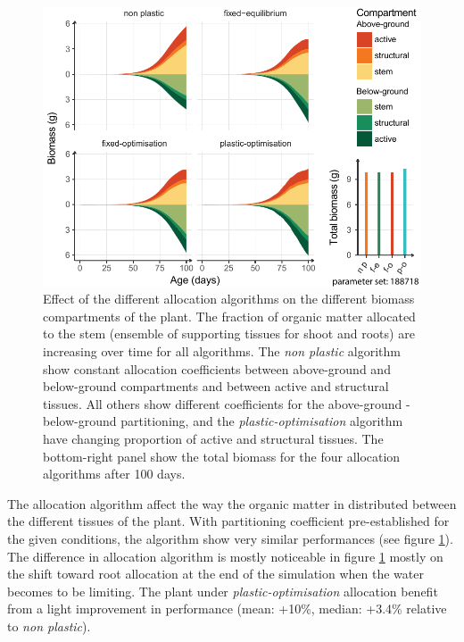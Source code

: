 \begin{figure}\label{fig:allocation}
\includegraphics[width = \textwidth]{./2_PP/Figures/Individual/allocation_rules.pdf}
\caption[Effect of the different allocation algorithms on the different biomass compartments]{Effect of the different allocation algorithms on the different biomass compartments of the plant. The fraction of organic matter allocated to the stem (ensemble of supporting tissues for shoot and roots) are increasing over time for all algorithms. The \textit{non plastic} algorithm show constant allocation coefficients between above-ground and below-ground compartments and between active and structural tissues. All others show different coefficients for the above-ground - below-ground partitioning, and the \textit{plastic-optimisation} algorithm have changing proportion of active and structural tissues. The bottom-right panel show the total biomass for the four allocation algorithms after 100 days. }
\end{figure}



The allocation algorithm affect the way the organic matter in distributed between the different tissues of the plant. With partitioning coefficient pre-established for the given conditions, the algorithm show very similar performances (see figure \ref{fig:allocation}). The difference in allocation algorithm is mostly noticeable in figure \ref{fig:allocation} mostly on the shift toward root allocation at the end of the simulation when the water becomes to be limiting. The plant under \textit{plastic-optimisation} allocation benefit from a light improvement in performance (mean: +10\%, median: +3.4\% relative to \textit{non plastic}).

